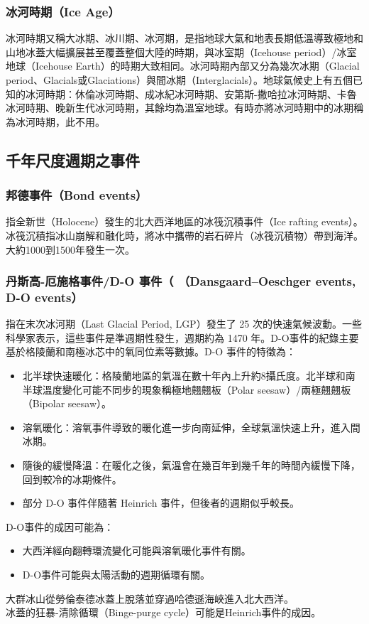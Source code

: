 \documentclass[a4paper,12pt]{report}
\begin{document}
\subsubsection{冰河時期（Ice Age）}
冰河時期又稱大冰期、冰川期、冰河期，是指地球大氣和地表長期低溫導致極地和山地冰蓋大幅擴展甚至覆蓋整個大陸的時期，與冰室期（Icehouse period）/冰室地球（Icehouse Earth）的時期大致相同。冰河時期內部又分為幾次冰期（Glacial period、Glacials或Glaciations）與間冰期（Interglacials）。地球氣候史上有五個已知的冰河時期：休倫冰河時期、成冰紀冰河時期、安第斯-撒哈拉冰河時期、卡魯冰河時期、晚新生代冰河時期，其餘均為溫室地球。有時亦將冰河時期中的冰期稱為冰河時期，此不用。
\subsection{千年尺度週期之事件}
\subsubsection{邦德事件（Bond events）}
指全新世（Holocene）發生的北大西洋地區的冰筏沉積事件（Ice rafting events）。冰筏沉積指冰山崩解和融化時，將冰中攜帶的岩石碎片（冰筏沉積物）帶到海洋。大約1000到1500年發生一次。
\subsubsection{丹斯高-厄施格事件/D-O 事件（
（Dansgaard–Oeschger events, D-O events）}
指在末次冰河期（Last Glacial Period, LGP）發生了 25 次的快速氣候波動。一些科學家表示，這些事件是準週期性發生，週期約為 1470 年。D-O事件的紀錄主要基於格陵蘭和南極冰芯中的氧同位素等數據。D-O 事件的特徵為：
\begin{itemize}
\item 北半球快速暖化：格陵蘭地區的氣溫在數十年內上升約8攝氏度。北半球和南半球溫度變化可能不同步的現象稱極地翹翹板（Polar seesaw）/兩極翹翹板（Bipolar seesaw）。
\item 溶氧暖化：溶氧事件導致的暖化進一步向南延伸，全球氣溫快速上升，進入間冰期。
\item 隨後的緩慢降溫：在暖化之後，氣溫會在幾百年到幾千年的時間內緩慢下降，回到較冷的冰期條件。
\item 部分 D-O 事件伴隨著 Heinrich 事件，但後者的週期似乎較長。
\end{itemize}
D-O事件的成因可能為：
\begin{itemize}
\item 大西洋經向翻轉環流變化可能與溶氧暖化事件有關。
\item D-O事件可能與太陽活動的週期循環有關。
\end{itemize}
大群冰山從勞倫泰德冰蓋上脫落並穿過哈德遜海峽進入北大西洋。\\
冰蓋的狂暴-清除循環（Binge-purge cycle）可能是Heinrich事件的成因。
\end{document}
